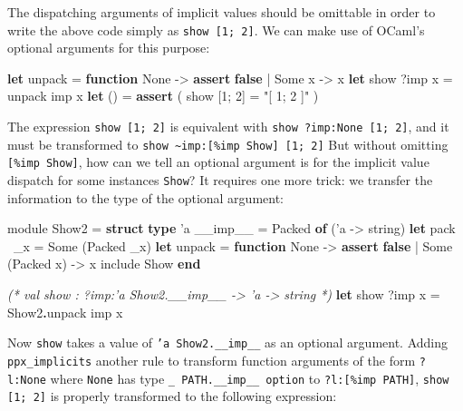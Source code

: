 \documentclass{article}
\newenvironment{Shaded}{}{}
\newcommand{\KeywordTok}[1]{\textcolor[rgb]{0.00,0.22,0.06}{\textbf{{#1}}}}
\newcommand{\DataTypeTok}[1]{\textcolor[rgb]{0.28,0.06,0.00}{{#1}}}
\newcommand{\StringTok}[1]{\textcolor[rgb]{0.12,0.22,0.30}{{#1}}}
\newcommand{\CommentTok}[1]{\textcolor[rgb]{0.19,0.30,0.30}{\textit{{#1}}}}
\newcommand{\OtherTok}[1]{\textcolor[rgb]{0.00,0.22,0.06}{{#1}}}
\newcommand{\NormalTok}[1]{{#1}}
\begin{document}
The dispatching arguments of implicit values should be omittable
in order to write the above code simply as \texttt{show {[}1; 2{]}}.
We can make use of OCaml's optional arguments for this purpose:

\begin{Shaded}
\begin{Highlighting}[]
  \KeywordTok{let} \NormalTok{unpack = }\KeywordTok{function} \DataTypeTok{None} \NormalTok{-> }\KeywordTok{assert} \KeywordTok{false} \NormalTok{| }\DataTypeTok{Some} \NormalTok{x -> x}
  \KeywordTok{let} \NormalTok{show ?imp x = unpack imp x}
  \KeywordTok{let} \NormalTok{() = }\KeywordTok{assert} \NormalTok{( show [1; 2] = }\StringTok{"[ 1; 2 ]"} \NormalTok{)}
\end{Highlighting}
\end{Shaded}

The expression \texttt{show {[}1; 2{]}} is equivalent with
\texttt{show ?imp:None {[}1; 2{]}}, and it must be transformed to
\texttt{show \textasciitilde{}imp:{[}\%imp Show{]} {[}1; 2{]}} 
But without omitting
\texttt{{[}\%imp Show{]}}, how can we tell an optional argument is for
the implicit value dispatch for some instances \texttt{Show}? It
requires one more trick: we transfer the information to the type of the
optional argument:

\begin{Shaded}
\begin{Highlighting}[]
  \OtherTok{module} \NormalTok{Show2 = }\KeywordTok{struct}
    \KeywordTok{type} \NormalTok{'a __imp__ = }\DataTypeTok{Packed} \KeywordTok{of} \NormalTok{('a -> }\DataTypeTok{string}\NormalTok{)}
    \KeywordTok{let} \NormalTok{pack ~_x = }\DataTypeTok{Some} \NormalTok{(}\DataTypeTok{Packed} \NormalTok{_x)}
    \KeywordTok{let} \NormalTok{unpack = }\KeywordTok{function} \DataTypeTok{None} \NormalTok{-> }\KeywordTok{assert} \KeywordTok{false} \NormalTok{| }\DataTypeTok{Some} \NormalTok{(}\DataTypeTok{Packed} \NormalTok{x) -> x}
    \OtherTok{include} \NormalTok{Show}
  \KeywordTok{end}
  
  \CommentTok{(* val show : ?imp:'a Show2.__imp__ -> 'a -> string *)}
  \KeywordTok{let} \NormalTok{show ?imp x = Show2}\KeywordTok{.}\NormalTok{unpack imp x}
\end{Highlighting}
\end{Shaded}

Now \texttt{show} takes a value of \texttt{'a Show2.\_\_imp\_\_} as an
optional argument. Adding \texttt{ppx\_implicits} another rule to
transform function arguments of the form \texttt{?l:None} where
\texttt{None} has type \texttt{\_ PATH.\_\_imp\_\_ option} to
\texttt{?l:{[}\%imp PATH{]}}, \texttt{show {[}1; 2{]}} is properly
transformed to the following expression:
\end{document}

